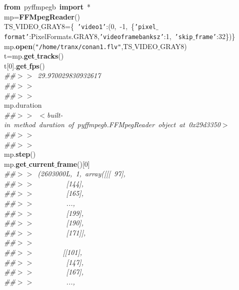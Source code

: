 \noindent
\mbox{}\textbf{from}\ pyffmpegb\ \textbf{import}\ * \\
\mbox{}mp=\textbf{FFMpegReader}() \\
\mbox{}TS$\_$VIDEO$\_$GRAY8=\{\ \texttt{'video1'}:(0,\ -1,\ \{\texttt{'pixel$\_$format'}:PixelFormats.GRAY8,\texttt{'videoframebanksz'}:1,\ \texttt{'skip$\_$frame'}:32\})\} \\
\mbox{}mp.\textbf{open}(\texttt{"{}/home/tranx/conan1.flv"{}},TS$\_$VIDEO$\_$GRAY8) \\
\mbox{}t=mp.\textbf{get$\_$tracks}() \\
\mbox{}t[0].\textbf{get$\_$fps}() \\
\mbox{}\textit{\#\#$>$$>$\ 29.970029830932617} \\
\mbox{}\textit{\#\#$>$$>$\ } \\
\mbox{}\textit{\#\#$>$$>$\ } \\
\mbox{}mp.duration \\
\mbox{}\textit{\#\#$>$$>$\ $<$built-in\ method\ duration\ of\ pyffmpegb.FFMpegReader\ object\ at\ 0x29d3350$>$} \\
\mbox{}\textit{\#\#$>$$>$\ } \\
\mbox{}\textit{\#\#$>$$>$\ } \\
\mbox{}mp.\textbf{step}() \\
\mbox{}mp.\textbf{get$\_$current$\_$frame}()[0] \\
\mbox{}\textit{\#\#$>$$>$\ (2603000L,\ 1,\ array([[[\ 97],} \\
\mbox{}\textit{\#\#$>$$>$\ \ \ \ \ \ \ \ \ [144],} \\
\mbox{}\textit{\#\#$>$$>$\ \ \ \ \ \ \ \ \ [165],} \\
\mbox{}\textit{\#\#$>$$>$\ \ \ \ \ \ \ \ \ ...,\ } \\
\mbox{}\textit{\#\#$>$$>$\ \ \ \ \ \ \ \ \ [199],} \\
\mbox{}\textit{\#\#$>$$>$\ \ \ \ \ \ \ \ \ [190],} \\
\mbox{}\textit{\#\#$>$$>$\ \ \ \ \ \ \ \ \ [171]],} \\
\mbox{}\textit{\#\#$>$$>$\ } \\
\mbox{}\textit{\#\#$>$$>$\ \ \ \ \ \ \ \ [[101],} \\
\mbox{}\textit{\#\#$>$$>$\ \ \ \ \ \ \ \ \ [147],} \\
\mbox{}\textit{\#\#$>$$>$\ \ \ \ \ \ \ \ \ [167],} \\
\mbox{}\textit{\#\#$>$$>$\ \ \ \ \ \ \ \ \ ...,\ } \\
